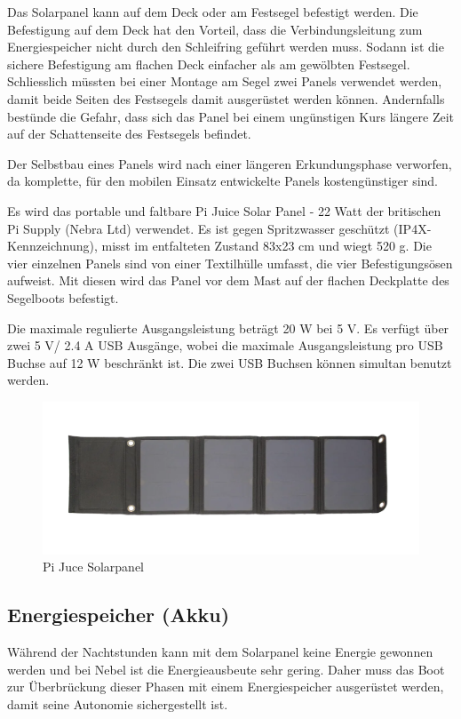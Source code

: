Das Solarpanel kann auf dem Deck oder am Festsegel befestigt werden. Die Befestigung auf dem Deck hat den Vorteil, dass die Verbindungsleitung zum Energiespeicher nicht durch den Schleifring geführt werden muss. Sodann ist die sichere Befestigung am flachen Deck einfacher als am gewölbten Festsegel. Schliesslich müssten bei einer Montage am Segel zwei Panels verwendet werden, damit beide Seiten des Festsegels damit ausgerüstet werden können. Andernfalls bestünde die Gefahr, dass sich das Panel bei einem ungünstigen Kurs längere Zeit auf der Schattenseite des Festsegels befindet.  

Der Selbstbau eines Panels wird nach einer längeren Erkundungsphase verworfen, da komplette, für den mobilen Einsatz entwickelte Panels kostengünstiger sind.   

Es wird das portable und faltbare Pi Juice Solar Panel - 22 Watt der britischen Pi Supply (Nebra Ltd) verwendet. Es ist gegen Spritzwasser geschützt (IP4X-Kennzeichnung), misst im entfalteten Zustand 83x23 cm und wiegt 520 g. Die vier einzelnen Panels sind von einer Textilhülle umfasst, die vier Befestigungsösen aufweist. Mit diesen wird das Panel vor dem Mast auf der flachen Deckplatte des Segelboots befestigt.

Die maximale regulierte Ausgangsleistung beträgt 20 W bei 5 V. Es verfügt über zwei 5 V/ 2.4 A USB Ausgänge, wobei die maximale Ausgangsleistung pro USB Buchse auf 12 W beschränkt ist. Die zwei USB Buchsen können simultan benutzt werden.
\begin{figure}[H]
\centering
    \includegraphics[width=1\linewidth]{assets/Pi juce.png}
    \caption{Pi Juce Solarpanel}
    \label{fig:enter-label}
\end{figure}
\subsection{Energiespeicher (Akku)}
Während der Nachtstunden kann mit dem Solarpanel keine Energie gewonnen werden und bei Nebel ist die Energieausbeute sehr gering. Daher muss das Boot zur Überbrückung dieser Phasen mit einem Energiespeicher ausgerüstet werden, damit seine Autonomie sichergestellt ist.

